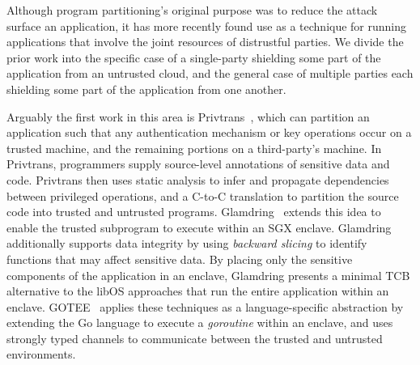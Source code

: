 Although program partitioning's original purpose was to reduce the attack
surface an application, it has more recently found use as a technique for
running applications that involve the joint resources of distrustful parties.
%
We divide the prior work into the specific case of a single-party shielding
some part of the application from an untrusted cloud, and the general case of
multiple parties each shielding some part of the application from one another.


%
Arguably the first work in this area is Privtrans~\cite{privtrans}, which
can partition an application such that any authentication mechanism or key
operations occur on a trusted machine, and the remaining portions on a
third-party's machine.
%
In Privtrans, programmers supply source-level annotations of sensitive data and
code.
%
Privtrans then uses static analysis to infer and propagate dependencies between
privileged operations, and a C-to-C translation to partition the source code
into trusted and untrusted programs.
%
Glamdring~\cite{glamdring} extends this idea to enable the trusted
subprogram to execute within an SGX enclave.
%
Glamdring additionally supports data integrity by using \emph{backward
slicing} to identify functions that may affect sensitive data.
%
By placing only the sensitive components of the application in an enclave,
Glamdring presents a minimal TCB alternative to the libOS approaches that
run the entire application within an enclave.
%
GOTEE~\cite{secured-routines} applies these techniques as  a language-specific
abstraction by extending the Go language to execute a \emph{goroutine} within
an enclave, and uses strongly typed channels to communicate between the trusted
and untrusted environments.




